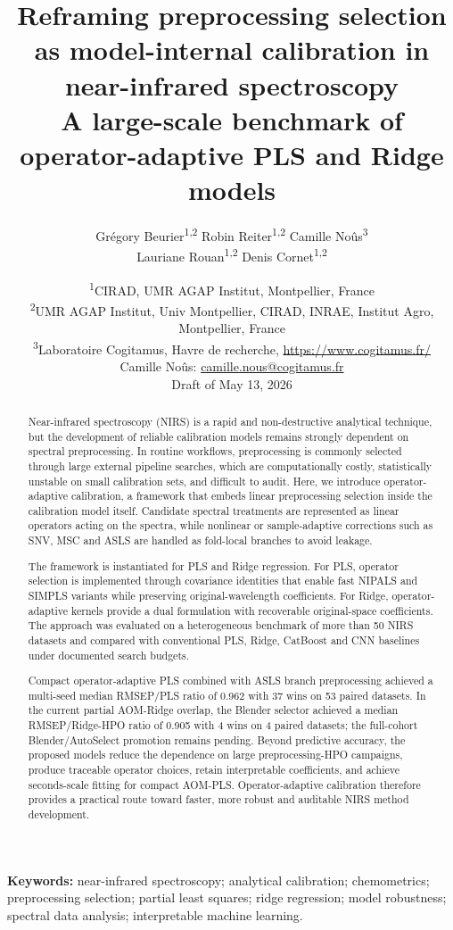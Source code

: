 \documentclass[11pt,a4paper]{article}
\title{\textbf{Reframing preprocessing selection as model-internal calibration in near-infrared spectroscopy}\\
\large A large-scale benchmark of operator-adaptive PLS and Ridge models}
\author{
Gr{\'e}gory Beurier\textsuperscript{1,2}
\quad Robin Reiter\textsuperscript{1,2}
\quad Camille No{\^u}s\textsuperscript{3}\\[0.35em]
Lauriane Rouan\textsuperscript{1,2}
\quad Denis Cornet\textsuperscript{1,2}
}
\date{
\textsuperscript{1}CIRAD, UMR AGAP Institut, Montpellier, France\\
\textsuperscript{2}UMR AGAP Institut, Univ Montpellier, CIRAD, INRAE, Institut Agro, Montpellier, France\\[0.75em]
\textsuperscript{3}Laboratoire Cogitamus, Havre de recherche, \url{https://www.cogitamus.fr/}\\
Camille No{\^u}s: \href{mailto:camille.nous@cogitamus.fr}{camille.nous@cogitamus.fr}\\[0.75em]
Draft of May 13, 2026
}
\begin{document}
\maketitle

\begin{abstract}
Near-infrared spectroscopy (NIRS) is a rapid and non-destructive analytical
technique, but the development of reliable calibration models remains strongly
dependent on spectral preprocessing.  In routine workflows, preprocessing is
commonly selected through large external pipeline searches, which are
computationally costly, statistically unstable on small calibration sets, and
difficult to audit.  Here, we introduce operator-adaptive calibration, a
framework that embeds linear preprocessing selection inside the calibration
model itself.  Candidate spectral treatments are represented as linear
operators acting on the spectra, while nonlinear or sample-adaptive corrections
such as SNV, MSC and ASLS are handled as fold-local branches to avoid leakage.

The framework is instantiated for PLS and Ridge regression.  For PLS, operator
selection is implemented through covariance identities that enable fast NIPALS
and SIMPLS variants while preserving original-wavelength coefficients.  For
Ridge, operator-adaptive kernels provide a dual formulation with recoverable
original-space coefficients.  The approach was evaluated on a heterogeneous
benchmark of more than 50 NIRS datasets and compared with conventional PLS,
Ridge, CatBoost and CNN baselines under documented search budgets.

Compact operator-adaptive PLS combined with ASLS branch preprocessing achieved
a multi-seed median RMSEP/PLS ratio of 0.962 with 37 wins on 53 paired
datasets.  In the current partial AOM-Ridge overlap, the Blender selector
achieved a median RMSEP/Ridge-HPO ratio of 0.905 with 4 wins on 4 paired
datasets; the full-cohort Blender/AutoSelect promotion remains pending.
Beyond predictive accuracy, the proposed models reduce the dependence on large
preprocessing-HPO campaigns, produce traceable operator choices, retain
interpretable coefficients, and achieve seconds-scale fitting for compact
AOM-PLS.  Operator-adaptive calibration therefore provides a practical route
toward faster, more robust and auditable NIRS method development.
\end{abstract}

\noindent\textbf{Keywords:} near-infrared spectroscopy; analytical calibration;
chemometrics; preprocessing selection; partial least squares; ridge
regression; model robustness; spectral data analysis; interpretable machine
learning.
\end{document}

